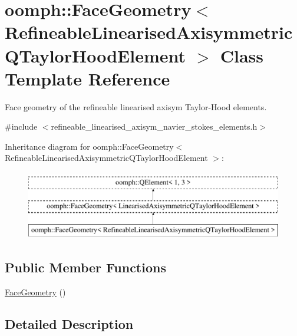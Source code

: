 \hypertarget{classoomph_1_1FaceGeometry_3_01RefineableLinearisedAxisymmetricQTaylorHoodElement_01_4}{}\section{oomph\+:\+:Face\+Geometry$<$ Refineable\+Linearised\+Axisymmetric\+Q\+Taylor\+Hood\+Element $>$ Class Template Reference}
\label{classoomph_1_1FaceGeometry_3_01RefineableLinearisedAxisymmetricQTaylorHoodElement_01_4}


Face geometry of the refineable linearised axisym Taylor-\/\+Hood elements.  




{\ttfamily \#include $<$refineable\+\_\+linearised\+\_\+axisym\+\_\+navier\+\_\+stokes\+\_\+elements.\+h$>$}

Inheritance diagram for oomph\+:\+:Face\+Geometry$<$ Refineable\+Linearised\+Axisymmetric\+Q\+Taylor\+Hood\+Element $>$\+:\begin{figure}[H]
\begin{center}
\leavevmode
\includegraphics[height=3.000000cm]{classoomph_1_1FaceGeometry_3_01RefineableLinearisedAxisymmetricQTaylorHoodElement_01_4}
\end{center}
\end{figure}
\subsection*{Public Member Functions}
\begin{DoxyCompactItemize}
\item 
\hyperlink{classoomph_1_1FaceGeometry_3_01RefineableLinearisedAxisymmetricQTaylorHoodElement_01_4_a24729fdb057ba3aee33371c133b7ee83}{Face\+Geometry} ()
\end{DoxyCompactItemize}


\subsection{Detailed Description}
